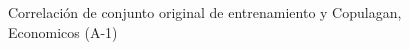 \begin{figure}[H]
    \centering
    
    \caption{Correlación de conjunto original de entrenamiento y Copulagan, Economicos (A-1)}
    \label{pairwise-economicos-a-1-copulagan}
\end{figure}